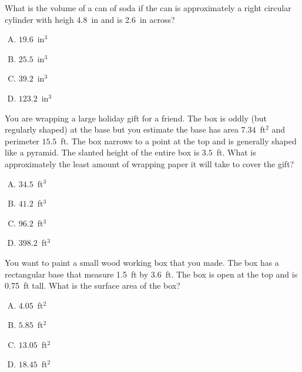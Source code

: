\documentclass[12pt,letterpaper]{exam}
\begin{document}
\begin{questions}
\vfill



\question What is the volume of a can of soda if the can is approximately a right circular cylinder with heigh 4.8~in and is 2.6~in across?
        \begin{enumerate}[A.]
        \item $19.6$~in$^3$
        \item $25.5$~in$^3$
        \item $39.2$~in$^3$
        \item $123.2$~in$^3$
        \end{enumerate}



\newpage



\question You are wrapping a large holiday gift for a friend. The box is oddly (but regularly shaped) at the base but you estimate the base has area $7.34$~ft$^2$ and perimeter $15.5$~ft. The box narrows to a point at the top and is generally shaped like a pyramid. The slanted height of the entire box is $3.5$~ft. What is approximately the least amount of wrapping paper it will take to cover the gift?
        \begin{enumerate}[A.]
        \item $34.5$~ft$^3$
        \item $41.2$~ft$^3$
        \item $96.2$~ft$^3$
        \item $398.2$~ft$^3$
        \end{enumerate}



\vfill



\question You want to paint a small wood working box that you made. The box has a rectangular base that measure 1.5~ft by 3.6~ft. The box is open at the top and is 0.75~ft tall. What is the surface area of the box?
        \begin{enumerate}[A.]
        \item $4.05$~ft$^2$
        \item $5.85$~ft$^2$
        \item $13.05$~ft$^2$
        \item $18.45$~ft$^2$
        \end{enumerate}



\vfill




\end{questions}
\end{document}
